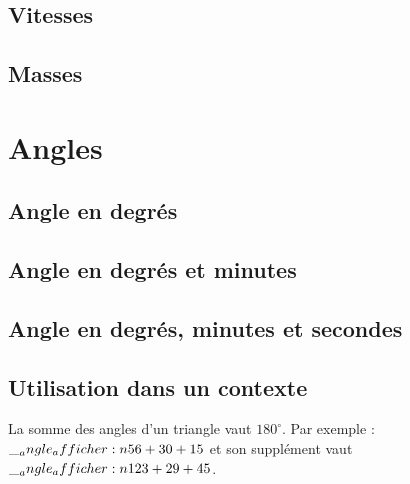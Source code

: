 \documentclass[11pt,a4paper]{article}
\begin{document}

\subsection{Vitesses}




\subsection{Masses}



\section{Angles}

\subsection{Angle en degrés}


\subsection{Angle en degrés et minutes}


\subsection{Angle en degrés, minutes et secondes}


\subsection{Utilisation dans un contexte}

\begin{retenir}
    La somme des angles d'un triangle vaut $180^\circ$.
    Par exemple : $\__angle_afficher:n {56+30+15}$ et son supplément vaut
    $\__angle_afficher:n {123+29+45}$.
\end{retenir}

\end{document}
